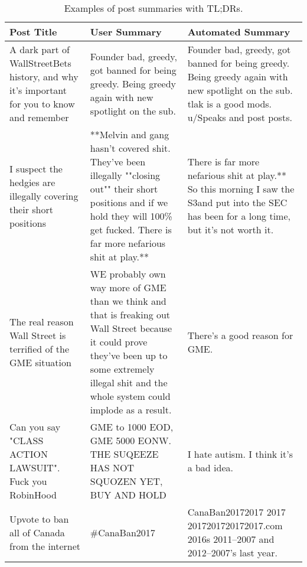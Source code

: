 \begin{table}[ht]%
	\caption{Examples of post summaries with TL;DRs.}%
	\label{tab:postSummariesWithTLDRS}%
	\renewcommand{\arraystretch}{1.6}%
	\def\tabularxcolumn#1{m{#1}}
	\begin{tabularx}{\textwidth}{@{}>{\centering}m{5cm} >{\centering}m{6cm} >{\centering\arraybackslash}m{5.5cm}@{}}%
		\toprule     %
		Post Title & User Summary & Automated Summary\\
		\midrule %
		A dark part of WallStreetBets history, and why it's important for you to know and remember & Founder bad, greedy, got banned for being greedy. Being greedy again with new spotlight on the sub. & Founder bad, greedy, got banned for being greedy. Being greedy again with new spotlight on the sub. tlak is a good mods. u/Speaks and post posts.\\
		I suspect the hedgies are illegally covering their short positions & **Melvin and gang hasn't covered shit. They've been illegally ""closing out"" their short positions and if we hold they will 100\% get fucked. There is far more nefarious shit at play.** & There is far more nefarious shit at play.** So this morning I saw the S3and put into the SEC has been for a long time, but it's not worth it.\\
		The real reason Wall Street is terrified of the GME situation & WE probably own way more of GME than we think and that is freaking out Wall Street because it could prove they've been up to some extremely illegal shit and the whole system could implode as a result. & There's a good reason for GME.\\
		Can you say "CLASS ACTION LAWSUIT". Fuck you RobinHood & GME to 1000 EOD, GME 5000 EONW. THE SUQEEZE HAS NOT SQUOZEN YET, BUY AND HOLD \gemstone\raisinghands\gemstone\rocket\rocket\rocket\rocket\rocket\rocket\rocket\rocket& I hate autism. I think it's a bad idea.\\
		Upvote to ban all of Canada from the internet & \#CanaBan2017 & CanaBan20172017 2017 2017201720172017.com 2016s 2011--2007 and 2012--2007's last year.\\
		\bottomrule %
	\end{tabularx}%
\end{table}

